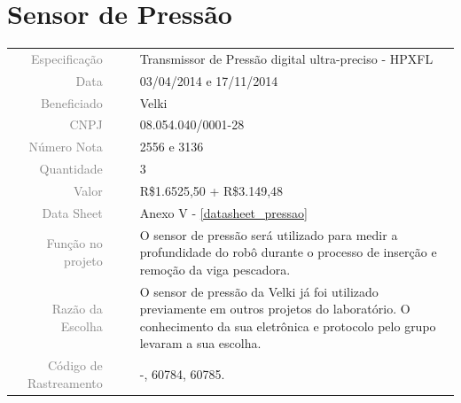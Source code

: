 

\section{Sensor de Pressão}
\label{pressao}


\begin{table}[ht!]

	\begin{tabular}{r l|l p{12cm} }
		
		\textcolor{gray}{Especificação} &&& 	{Transmissor de Pressão digital
		ultra-preciso - HPXFL}\\
		\textcolor{gray}{Data} &&& 				{03/04/2014 e 17/11/2014}\\
        \textcolor{gray}{Beneficiado} &&&		{Velki} \\
        \textcolor{gray}{CNPJ} &&& 				{08.054.040/0001-28} \\
        \textcolor{gray}{Número Nota} &&& 		{2556 e 3136} \\
		\textcolor{gray}{Quantidade} &&& 		{3} \\
		\textcolor{gray}{Valor} &&& 			{R\$1.6525,50 + R\$3.149,48} \\
		\textcolor{gray}{Data Sheet} &&& 		{Anexo V - \ref{datasheet_pressao} } \\

		\textcolor{gray}{Função no projeto} &&& {O sensor de pressão será utilizado
		para medir a profundidade do robô durante o processo de inserção e remoção da
		viga pescadora.} \\
		\textcolor{gray}{Razão da Escolha} &&& {O sensor de pressão da Velki já foi
		utilizado previamente em outros projetos do laboratório. O conhecimento da sua
		eletrônica e protocolo pelo grupo levaram a sua escolha.}\\
		\textcolor{gray}{Código de Rastreamento} &&& {-, 60784, 60785.}
		

	\end{tabular}
\end{table}

\newpage
